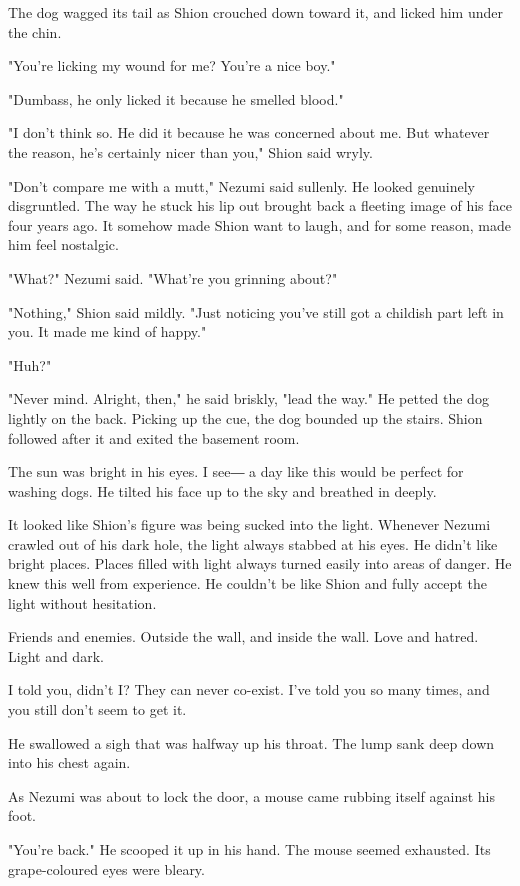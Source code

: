 The dog wagged its tail as Shion crouched down toward it, and licked him
under the chin.

"You're licking my wound for me? You're a nice boy."

"Dumbass, he only licked it because he smelled blood."

"I don't think so. He did it because he was concerned about me. But
whatever the reason, he's certainly nicer than you," Shion said wryly.

"Don't compare me with a mutt," Nezumi said sullenly. He looked
genuinely disgruntled. The way he stuck his lip out brought back a
fleeting image of his face four years ago. It somehow made Shion want to
laugh, and for some reason, made him feel nostalgic.

"What?" Nezumi said. "What're you grinning about?"

"Nothing," Shion said mildly. "Just noticing you've still got a childish
part left in you. It made me kind of happy."

"Huh?"

"Never mind. Alright, then," he said briskly, "lead the way." He petted
the dog lightly on the back. Picking up the cue, the dog bounded up the
stairs. Shion followed after it and exited the basement room.

The sun was bright in his eyes. I see― a day like this would be perfect
for washing dogs. He tilted his face up to the sky and breathed in
deeply.

It looked like Shion's figure was being sucked into the light. Whenever
Nezumi crawled out of his dark hole, the light always stabbed at his
eyes. He didn't like bright places. Places filled with light always
turned easily into areas of danger. He knew this well from experience.
He couldn't be like Shion and fully accept the light without hesitation.

Friends and enemies. Outside the wall, and inside the wall. Love and
hatred. Light and dark.

I told you, didn't I? They can never co-exist. I've told you so many
times, and you still don't seem to get it.

He swallowed a sigh that was halfway up his throat. The lump sank deep
down into his chest again.

As Nezumi was about to lock the door, a mouse came rubbing itself
against his foot.

"You're back." He scooped it up in his hand. The mouse seemed exhausted.
Its grape-coloured eyes were bleary.

